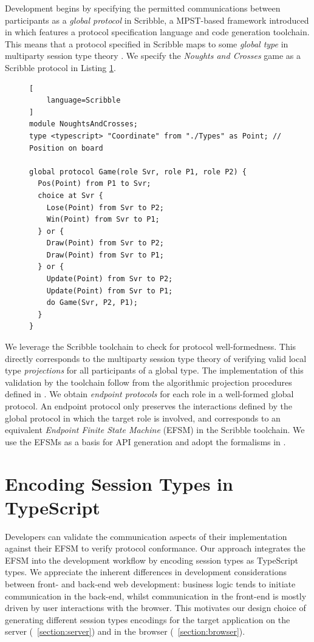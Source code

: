 \documentclass[submission,copyright,creativecommons]{eptcs}
\newcommand{\sectionref}[1]{\textsection~\ref{#1}}
\begin{document}
Development begins by specifying the permitted communications between participants as a \textit{global protocol} in Scribble, a MPST-based framework introduced in \cite{Scribble} which features a protocol specification language and code generation toolchain. This means that a protocol specified in Scribble maps to some \textit{global type} in multiparty session type theory \cite{MPST}. We specify the \textit{Noughts and Crosses} game as a Scribble protocol in Listing \ref{lst:game}.

\begin{figure}[!h]
\begin{lstlisting}[
	language=Scribble
]
module NoughtsAndCrosses;
type <typescript> "Coordinate" from "./Types" as Point;	// Position on board

global protocol Game(role Svr, role P1, role P2) {
  Pos(Point) from P1 to Svr;
  choice at Svr {
    Lose(Point) from Svr to P2;
    Win(Point) from Svr to P1;
  } or {
    Draw(Point) from Svr to P2;
    Draw(Point) from Svr to P1;
  } or {
    Update(Point) from Svr to P2;
    Update(Point) from Svr to P1;
    do Game(Svr, P2, P1);
  }
}
\end{lstlisting}
\label{lst:game}
\end{figure}

We leverage the Scribble toolchain to check for protocol well-formedness. This directly corresponds to the multiparty session type theory of verifying valid local type \textit{projections} for all participants of a global type. The implementation of this validation by the toolchain follow from the algorithmic projection procedures defined in \cite{MPST}. We obtain \textit{endpoint protocols} for each role in a well-formed global protocol. An endpoint protocol only preserves the interactions defined by the global protocol in which the target role is involved, and corresponds to an equivalent \textit{Endpoint Finite State Machine} (EFSM) in the Scribble toolchain. We use the EFSMs as a basis for API generation and adopt the formalisms in \cite{Hybrid2016}.


\section{Encoding Session Types in TypeScript}

Developers can validate the communication aspects of their implementation against their EFSM to verify protocol conformance. Our approach integrates the EFSM into the development workflow by encoding session types as TypeScript types. We appreciate the inherent differences in development considerations between front- and back-end web development: business logic tends to initiate communication in the back-end, whilst communication in the front-end is mostly driven by user interactions with the browser. This motivates our design choice of generating different session types encodings for the target application on the server (\sectionref{section:server}) and in the browser (\sectionref{section:browser}).
\end{document}
